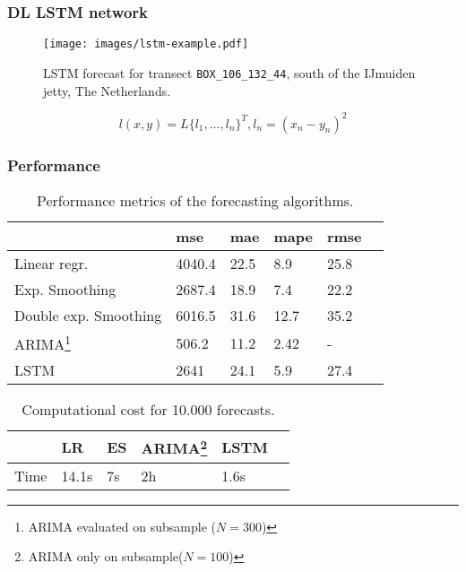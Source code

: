 \documentclass[10pt]{beamer}
\theoremstyle{remark}
\theoremstyle{definition}
\newcommand{\examplebox}[2]{
\begin{tcolorbox}[colframe=darkcardinal,colback=boxgray,title=#1]
#2
\end{tcolorbox}}
\begin{document}
\begin{frame}
	\frametitle{DL LSTM network}
	\begin{figure}
		\centering
		\texttt{[image: images/lstm-example.pdf]}
		\caption{LSTM forecast for transect \texttt{BOX\_106\_132\_44}, south of the IJmuiden jetty, The Netherlands.}
		\label{fig:lstm-example}
	\end{figure}
\examplebox{}{
\begin{equation}
\label{eq:mseloss}
l(x, y) = L \{l_1, \dots, l_n\}^T, l_n = (x_n - y_n)^2
\end{equation}  
}
\end{frame}

\begin{frame}[allowframebreaks]
\frametitle{Performance}
\examplebox{Quality metrics}{
\begin{table}[h]
	\centering
	\caption{Performance metrics of the forecasting algorithms.}
	\label{tab:metrics}
	\begin{tabular}{llllll}
		\hline
		& mse    & mae  & mape & rmse & \\ 
		\hline
		Linear regr.          & 4040.4 & 22.5 & 8.9  & 25.8 & \\
		Exp. Smoothing        & 2687.4 & 18.9 & 7.4  & 22.2 & \\
		Double exp. Smoothing & 6016.5 & 31.6 & 12.7 & 35.2 & \\
		ARIMA\footnote{ARIMA evaluated on subsample ($N=300$)}                 & 506.2  & 11.2 & 2.42 & -    & \\
		LSTM                  & 2641   & 24.1 & 5.9  & 27.4 & \\
		\hline
	\end{tabular}
\end{table}
}

\framebreak

%
%


\examplebox{Computational cost}{
	\begin{table}[h]
		\centering
		\caption{Computational cost for 10.000 forecasts.}
		\label{tab:cost}
		\begin{tabular}{llllll}
			\hline
			& LR    & ES  & \alert{ARIMA\footnote{\alert{ARIMA only on subsample($N=100$)}}} & LSTM & \\ 
			\hline
			Time          & 14.1s  & 7s & 2h  & 1.6s & \\
			\hline
		\end{tabular}
	\end{table}
}


\end{frame}
\end{document}
